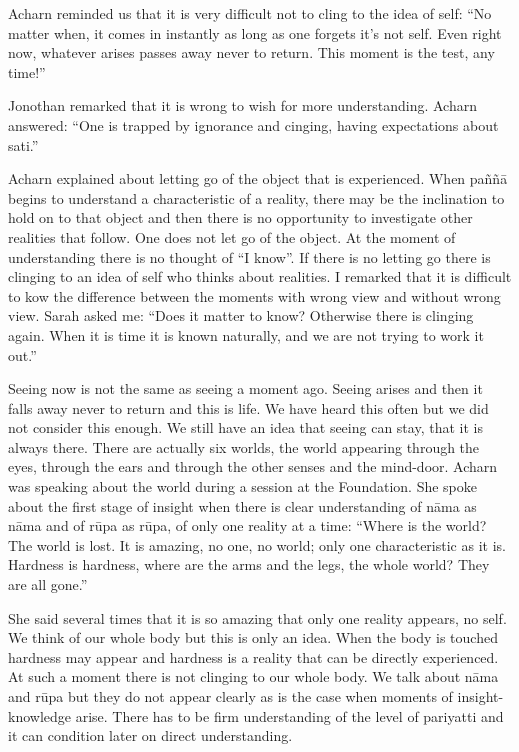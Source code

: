 {Acharn reminded us that it is very difficult not to cling to
the idea of self: ``No matter when, it comes in instantly as long as one
forgets it's not self. Even right now, whatever arises passes away never
to return. This moment is the test, any time!''

Jonothan remarked that it is wrong to wish for more
understanding. Acharn answered: ``One is trapped by ignorance and
cinging, having expectations about sati.'' 

Acharn explained about letting go of the object that is
experienced. When paññā begins to understand a characteristic of a
reality, there may be the inclination to hold on to that object and then
there is no opportunity to investigate other realities that follow. One
does not let go of the object. At the moment of understanding there is
no thought of ``I know''. If there is no letting go there is clinging to
an idea of self who thinks about realities. I remarked that it is
difficult to kow the difference between the moments with wrong view and
without wrong view. Sarah asked me: ``Does it matter to know? Otherwise
there is clinging again. When it is time it is known naturally, and we
are not trying to work it out.''

Seeing now is not the same as seeing a moment ago. Seeing
arises and then it falls away never to return and this is life. We have
heard this often but we did not consider this enough. We still have an
idea that seeing can stay, that it is always there. There are actually
six worlds, the world appearing through the eyes, through the ears and
through the other senses and the mind-door. Acharn was speaking about
the world during a session at the Foundation. She spoke about the first
stage of insight when there is clear understanding of nāma as nāma and
of rūpa as rūpa, of only one reality at a time: ``Where is the world?
The world is lost. It is amazing, no one, no world; only one
characteristic as it is. Hardness is hardness, where are the arms and
the legs, the whole world? They are all gone.''

She said several times that it is so amazing that only one
reality appears, no self. We think of our whole body but this is only an
idea. When the body is touched hardness may appear and hardness is a
reality that can be directly experienced. At such a moment there is not
clinging to our whole body. We talk about nāma and rūpa but they do not
appear clearly as is the case when moments of insight-knowledge arise.
There has to be firm understanding of the level of pariyatti and it can
condition later on direct understanding. 

}
